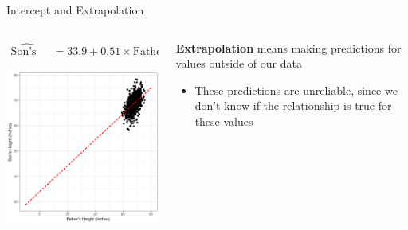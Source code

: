 \documentclass{beamer}
\begin{document}
\begin{frame}{Intercept and Extrapolation}

\begin{columns}

 \begin{column}{0.45\textwidth}
\footnotesize
\begin{align*}
\widehat{\text{Son's Height}} &= 33.9 + 0.51 \times \text{Father's Height}
\end{align*}
\begin{center}
\includegraphics[scale=0.4]{father_son3.png}
\end{center}
 \end{column}
 \begin{column}{0.45\textwidth}
\textbf{Extrapolation} means making predictions for values outside of our data
\begin{itemize}
    \item These predictions are unreliable, since we don't know if the relationship is true for these values
\end{itemize}
 \end{column}
\end{columns}
\end{frame}
\end{document}
